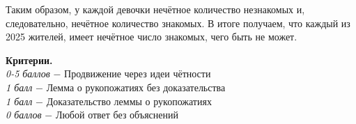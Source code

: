 Таким образом, у каждой девочки нечётное количество незнакомых и, следовательно, нечётное количество знакомых. В итоге получаем, что каждый из 2025 жителей, имеет нечётное число знакомых, чего быть не может.

\textbf{Критерии.} \\
\textit{0-5 баллов} $-$ Продвижение через идеи чётности\\
\textit{1 балл} $-$ Лемма о рукопожатиях без доказательства\\
\textit{1 балл} $-$ Доказательство леммы о рукопожатиях\\
\textit{0 баллов} $-$ Любой ответ без объяснений\\